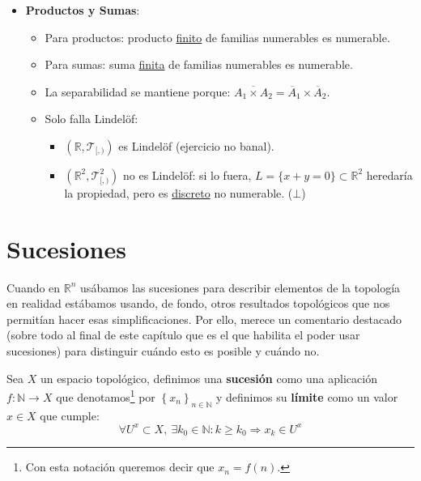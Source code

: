 \begin{demo}
\begin{itemize}
    \item \textbf{Productos y Sumas}:
    \begin{itemize}
        \item Para productos: producto \underline{finito} de familias numerables es numerable.
        \item Para sumas: suma \underline{finita} de familias numerables es numerable.
        \item La separabilidad se mantiene porque: $\overline{A_1 \times A_2} = \overline{A}_1 \times \overline{A}_2$.
        \item Solo falla Lindelöf:
        \begin{itemize}
            \item $\left( \mathbb{R}, \mathcal{T}_{[, )} \right)$ es Lindelöf (ejercicio no banal).
            \item $\left( \mathbb{R}^2, \mathcal{T}_{[, )}^2 \right)$ no es Lindelöf: si lo fuera, $L = \{x + y = 0\} \subset \mathbb{R}^2$ heredaría la propiedad, pero es \underline{discreto} no numerable. ($\bot$)
        \end{itemize}
    \end{itemize}
\end{itemize} 
\end{demo}


\section{Sucesiones}
\label{sub:sucesiones}
Cuando en $\mathbb{R}^n$ usábamos las sucesiones para describir elementos de la topología en realidad estábamos usando, de fondo, otros resultados topológicos que nos permitían hacer esas simplificaciones. Por ello, merece un comentario destacado (sobre todo al final de este capítulo que es el que habilita el poder usar sucesiones) para distinguir cuándo esto es posible y cuándo no.


\begin{defi}
Sea $X$ un espacio topológico, definimos una \textbf{sucesión} como una aplicación $f: \mathbb{N} \rightarrow X$ que denotamos\footnote{Con esta notación queremos decir que $x_n = f\left( n \right)$.} por $\left\{ x_n \right\}_{n \in \mathbb{N}}$ y definimos su \textbf{límite} como un valor $x\in X$ que cumple:
\[
\forall U^x \subset X, \ \exists k_0 \in \mathbb{N}: k \ge k_0 \Rightarrow x_k \in U^x
\]
\end{defi}

